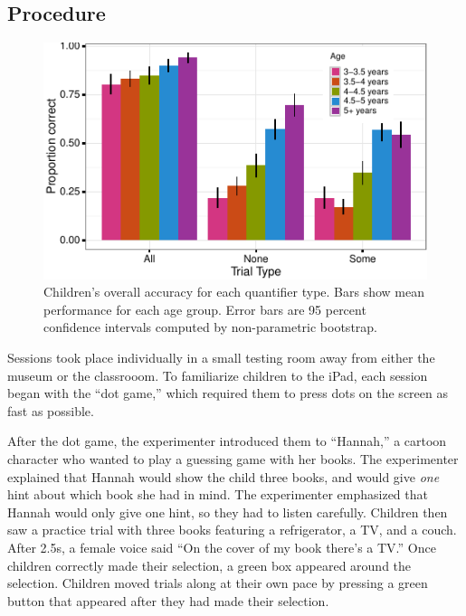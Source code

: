 \documentclass[10pt, letterpaper]{article}
\newenvironment{CodeChunk}{}{}
\begin{document}
\subsection{Procedure}\label{procedure}

\begin{CodeChunk}
\begin{figure}[t]
\includegraphics{figs/overall_acc-1} \caption[Children's overall accuracy for each quantifier type]{Children's overall accuracy for each quantifier type. Bars show mean performance for each age group. Error bars are 95 percent confidence intervals computed by non-parametric bootstrap.}\label{fig:overall_acc}
\end{figure}
\end{CodeChunk}

Sessions took place individually in a small testing room away from
either the museum or the classrooom. To familiarize children to the
iPad, each session began with the ``dot game,'' which required them to
press dots on the screen as fast as possible.

After the dot game, the experimenter introduced them to ``Hannah,'' a
cartoon character who wanted to play a guessing game with her books. The
experimenter explained that Hannah would show the child three books, and
would give \emph{one} hint about which book she had in mind. The
experimenter emphasized that Hannah would only give one hint, so they
had to listen carefully. Children then saw a practice trial with three
books featuring a refrigerator, a TV, and a couch. After 2.5s, a female
voice said ``On the cover of my book there's a TV.'' Once children
correctly made their selection, a green box appeared around the
selection. Children moved trials along at their own pace by pressing a
green button that appeared after they had made their selection.
\end{document}
